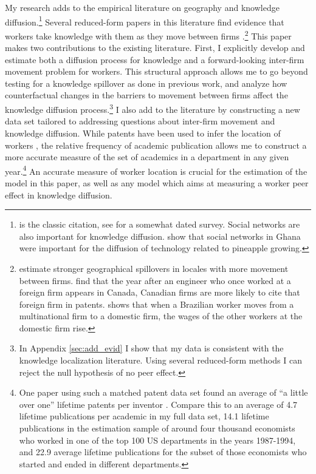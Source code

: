 My research adds to the empirical literature on geography and knowledge diffusion.\footnote{\citep{jaffe1993geographic} is the classic citation, see \citep{breschi2001knowledge} for a somewhat dated survey.  Social networks are also important for knowledge diffusion. \citet{conley2010learning} show that social networks in Ghana were important for the diffusion of technology related to pineapple growing.} Several reduced-form papers in this literature find evidence that workers take knowledge with them as they move between firms \citep{almeida1999localization, oettl2008international, poole2013knowledge}.\footnote{\citep{almeida1999localization} estimate stronger geographical spillovers in locales with more movement between firms. \citet{oettl2008international} find that the year after an engineer who once worked at a foreign firm appears in Canada, Canadian firms are more likely to cite that foreign firm in patents. \citet{poole2013knowledge} shows that when a Brazilian worker moves from a multinational firm to a domestic firm, the wages of the other workers at the domestic firm rise.}   This paper makes two contributions to the existing literature. First, I explicitly develop and estimate both a diffusion process for knowledge and a forward-looking inter-firm movement problem for workers.  This structural approach allows me to go beyond testing for a knowledge spillover as done in previous work, and analyze how counterfactual changes in the barriers to movement between firms affect the knowledge diffusion process.\footnote{In Appendix \ref{sec:add_evid} I show that my data is consistent with the knowledge localization literature. Using several reduced-form methods I can reject the null hypothesis of no peer effect.}   I also add to the literature by constructing a new data set tailored to addressing questions about inter-firm movement and knowledge diffusion.  While patents have been used to infer the location of workers \citep{oettl2008international}, the relative frequency of academic publication allows me to construct a more accurate measure of the set of academics in a department in any given year.\footnote{One paper using such a matched patent data set found an average of ``a little over one'' lifetime patents per inventor \citep{kim2009international}. Compare this to an average of 4.7 lifetime publications per academic in my full data set, 14.1 lifetime publications in the estimation sample of around four thousand economists who worked in one of the top 100 US departments in the years 1987-1994, and 22.9 average lifetime publications for the subset of those economists who started and ended in different departments.} An accurate measure of worker location is crucial for the estimation of the model in this paper, as well as any model which aims at measuring a worker peer effect in knowledge diffusion. %


